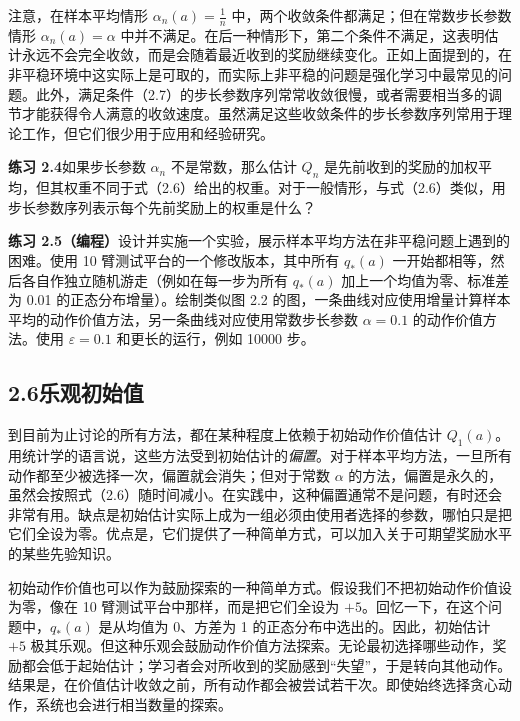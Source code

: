 \documentclass[UTF8,12pt,a4paper,fontset=fandol]{ctexart}
\begin{document}
注意，在样本平均情形 $\alpha_n(a)=\frac{1}{n}$ 中，两个收敛条件都满足；但在常数步长参数情形 $\alpha_n(a)=\alpha$ 中并不满足。在后一种情形下，第二个条件不满足，这表明估计永远不会完全收敛，而是会随着最近收到的奖励继续变化。正如上面提到的，在非平稳环境中这实际上是可取的，而实际上非平稳的问题是强化学习中最常见的问题。此外，满足条件（2.7）的步长参数序列常常收敛很慢，或者需要相当多的调节才能获得令人满意的收敛速度。虽然满足这些收敛条件的步长参数序列常用于理论工作，但它们很少用于应用和经验研究。

\noindent\textbf{练习 2.4}\quad 如果步长参数 $\alpha_n$ 不是常数，那么估计 $Q_n$ 是先前收到的奖励的加权平均，但其权重不同于式（2.6）给出的权重。对于一般情形，与式（2.6）类似，用步长参数序列表示每个先前奖励上的权重是什么？

\noindent\textbf{练习 2.5（编程）}\quad 设计并实施一个实验，展示样本平均方法在非平稳问题上遇到的困难。使用 10 臂测试平台的一个修改版本，其中所有 $q_*(a)$ 一开始都相等，然后各自作独立随机游走（例如在每一步为所有 $q_*(a)$ 加上一个均值为零、标准差为 0.01 的正态分布增量）。绘制类似图 2.2 的图，一条曲线对应使用增量计算样本平均的动作价值方法，另一条曲线对应使用常数步长参数 $\alpha=0.1$ 的动作价值方法。使用 $\varepsilon=0.1$ 和更长的运行，例如 10000 步。

\subsection*{2.6\quad 乐观初始值}

到目前为止讨论的所有方法，都在某种程度上依赖于初始动作价值估计 $Q_1(a)$。用统计学的语言说，这些方法受到初始估计的\textit{偏置}。对于样本平均方法，一旦所有动作都至少被选择一次，偏置就会消失；但对于常数 $\alpha$ 的方法，偏置是永久的，虽然会按照式（2.6）随时间减小。在实践中，这种偏置通常不是问题，有时还会非常有用。缺点是初始估计实际上成为一组必须由使用者选择的参数，哪怕只是把它们全设为零。优点是，它们提供了一种简单方式，可以加入关于可期望奖励水平的某些先验知识。

初始动作价值也可以作为鼓励探索的一种简单方式。假设我们不把初始动作价值设为零，像在 10 臂测试平台中那样，而是把它们全设为 $+5$。回忆一下，在这个问题中，$q_*(a)$ 是从均值为 0、方差为 1 的正态分布中选出的。因此，初始估计 $+5$ 极其乐观。但这种乐观会鼓励动作价值方法探索。无论最初选择哪些动作，奖励都会低于起始估计；学习者会对所收到的奖励感到“失望”，于是转向其他动作。结果是，在价值估计收敛之前，所有动作都会被尝试若干次。即使始终选择贪心动作，系统也会进行相当数量的探索。
\end{document}
